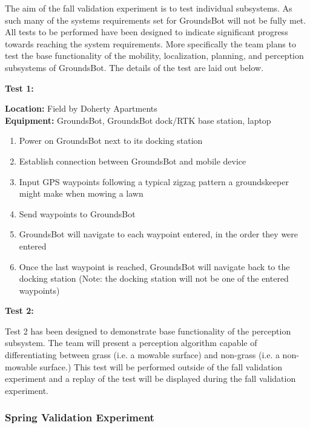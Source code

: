 \documentclass[12pt]{extarticle}
\begin{document}
	The aim of the fall validation experiment is to test individual subsystems. As such many of the systems requirements set for GroundsBot will not be fully met. All tests to be performed have been designed to indicate significant progress towards reaching the system requirements. More specifically the team plans to test the base functionality of the mobility, localization, planning, and perception subsystems of GroundsBot. The details of the test are laid out below.
\\
\begin{center}
\textbf{Test 1:}
\end{center}
 \textbf{Location:} Field by Doherty Apartments \cite{interview-guenther}
\\
\textbf{Equipment:} GroundsBot, GroundsBot dock/RTK base station, laptop
\begin{enumerate}
  \item Power on GroundsBot next to its docking station
  \item Establish connection between GroundsBot and mobile device
  \item Input GPS waypoints following a typical zigzag pattern a groundskeeper might make when mowing a lawn
  \item Send waypoints to GroundsBot
  \item GroundsBot will navigate to each waypoint entered, in the order they were entered
  \item Once the last waypoint is reached, GroundsBot will navigate back to the docking station (Note: the docking station will not be one of the entered waypoints)
\end{enumerate}

\begin{center}
\textbf{Test 2:}
\end{center}
Test 2 has been designed to demonstrate base functionality of the perception subsystem. The team will present a perception algorithm capable of differentiating between grass (i.e. a mowable surface) and non-grass (i.e. a non-mowable surface.) This test will be performed outside of the fall validation experiment and a replay of the test will be displayed during the fall validation experiment.

\newpage
\subsubsection{Spring Validation Experiment}
\end{document}
